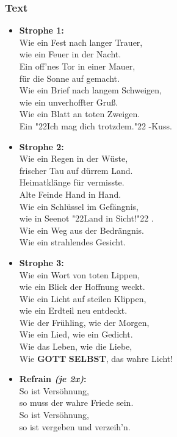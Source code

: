 \documentclass[10pt,a5paper]{article}
\newcommand{\Gott}[0]{\textbf{GOTT}}
\newcommand{\Selbst}[0]{\textbf{SELBST}}
\newcommand{\q}[1]{\char"22{#1}\char"22 }
\begin{document}
		\subsubsection{Text}
			\begin{itemize}
				\item	\textbf{Strophe 1:}
				\\		Wie ein Fest nach langer Trauer,
				\\		wie ein Feuer in der Nacht.
				\\		Ein off'nes Tor in einer Mauer,
				\\		f\"ur die Sonne auf gemacht.
				\\		Wie ein Brief nach langem Schweigen,
				\\		wie ein unverhoffter Gru{\ss}.
				\\		Wie ein Blatt an toten Zweigen.
				\\		Ein \q{Ich mag dich trotzdem.}-Kuss.
				\item	\textbf{Strophe 2:}
				\\		Wie ein Regen in der W\"uste,
				\\		frischer Tau auf d\"urrem Land.
				\\		Heimatkl\"ange für vermisste.
				\\		Alte Feinde Hand in Hand.
				\\		Wie ein Schl\"ussel im Gef\"angnis,
				\\		wie in Seenot \q{Land in Sicht!}.
				\\		Wie ein Weg aus der Bedr\"angnis.
				\\		Wie ein strahlendes Gesicht.
				\item	\textbf{Strophe 3:}
				\\		Wie ein Wort von toten Lippen,
				\\		wie ein Blick der Hoffnung weckt.
				\\		Wie ein Licht auf steilen Klippen,
				\\		wie ein Erdteil neu entdeckt.
				\\		Wie der Fr\"uhling,
						wie der Morgen,
				\\		Wie ein Lied,
						wie ein Gedicht.
				\\		Wie das Leben,
						wie die Liebe,
				\\		Wie {\Gott} {\Selbst},
						das wahre Licht!
				\item	\textbf{Refrain \textit{(je 2x)}:}
				\\		So ist Vers\"ohnung,
				\\		so muss der wahre Friede sein.
				\\		So ist Vers\"ohnung,
				\\		so ist vergeben und verzeih'n.
			\end{itemize}
		
\end{document}
